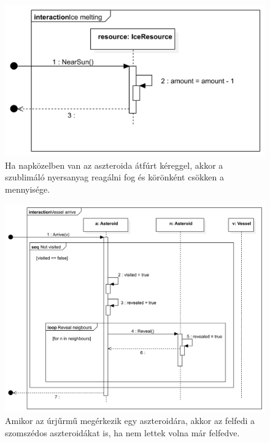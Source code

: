 \begin{figure}[H] 
\centering 
\includegraphics[width=1\textwidth]{docs/3_Project/svg/Design Model!Sun Distance!Ice melting!Ice melting_10.png} 
\caption{Ha napközelben van az aszteroida átfúrt kéreggel, akkor a szublimáló nyersanyag reagálni fog és körönként csökken a mennyisége.} 
\end{figure} 

\begin{figure}[H] 
\centering 
\includegraphics[width=1\textwidth]{docs/3_Project/svg/Design Model!Vessel Actions!Vessel arrive!Vessel arrive_11.png} 
\caption{Amikor az úrjűrmű megérkezik egy aszteroidára, akkor az felfedi a szomszédos aszteroidákat is, ha nem lettek volna már felfedve.} 
\end{figure} 

